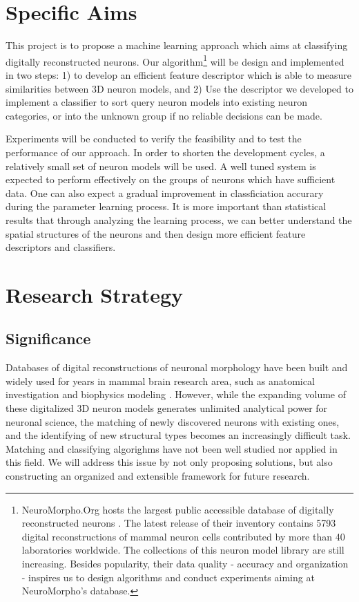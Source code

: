 \documentclass[letterpaper,11pt,oneside]{article}
\begin{document}
\section{Specific Aims }
This project is to propose a machine learning approach which aims at classifying digitally reconstructed neurons. Our algorithm\footnote{NeuroMorpho.Org hosts the largest public accessible database of digitally reconstructed neurons \cite{Ascoli07}\cite{neuromorpho}. The latest release of their inventory contains 5793 digital reconstructions of mammal neuron cells contributed by more than 40 laboratories worldwide. The collections of this neuron model library are still increasing. Besides popularity, their data quality - accuracy and organization - inspires us to design algorithms and conduct experiments aiming at NeuroMorpho's database. } will be design and implemented in two steps: 1) to develop an efficient feature descriptor which is able to measure similarities between 3D neuron models, and 2) Use the descriptor we developed to implement a classifier to sort query neuron models into existing neuron categories, or into the unknown group if no reliable decisions can be made. 

Experiments will be conducted to verify the feasibility and to test the performance of our approach. In order to shorten the development cycles, a relatively small set of neuron models will be used. A well tuned system is expected to perform effectively on the groups of neurons which have sufficient data. One can also expect a gradual improvement in classficiation accurary during the parameter learning process. It is more important than statistical results that through analyzing the learning process, we can better understand the spatial structures of the neurons and then design more efficient feature descriptors and classifiers.

\section{Research Strategy}
\subsection{Significance}
Databases of digital reconstructions of neuronal morphology have been built and widely used for years in mammal brain research area, such as anatomical investigation and biophysics modeling \cite{Ascoli07}. However, while the expanding volume of these digitalized 3D neuron models generates unlimited analytical power for neuronal science, the matching of newly discovered neurons with existing ones, and the identifying of new structural types becomes an increasingly difficult task. Matching and classifying algorighms have not been well studied nor applied in this field. We will address this issue by not only proposing solutions, but also constructing an organized and extensible framework for future research. 
\end{document}
